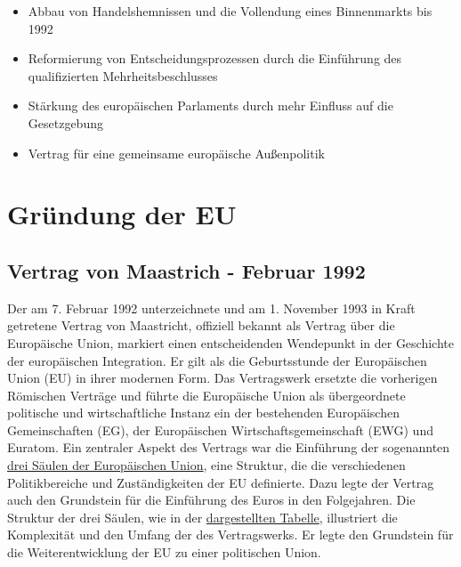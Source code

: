 \documentclass[12pt, oneside]{book} %
\begin{document}
\begin{itemize}
    \item Abbau von Handelshemnissen und die Vollendung eines Binnenmarkts bis 1992
    \item Reformierung von Entscheidungsprozessen durch die Einführung des qualifizierten Mehrheitsbeschlusses
    \item Stärkung des europäischen Parlaments durch mehr Einfluss auf die Gesetzgebung
    \item Vertrag für eine gemeinsame europäische Außenpolitik
\end{itemize}

\chapter{Gründung der EU}

\section{Vertrag von Maastrich - Februar 1992}
Der am 7. Februar 1992 unterzeichnete und am 1. November 1993 in Kraft getretene Vertrag von Maastricht, offiziell bekannt als Vertrag über die Europäische Union, markiert einen entscheidenden Wendepunkt in der Geschichte der europäischen Integration. Er gilt als die Geburtsstunde der Europäischen Union (EU) in ihrer modernen Form. Das Vertragswerk ersetzte die vorherigen Römischen Verträge und führte die Europäische Union als übergeordnete politische und wirtschaftliche Instanz ein der bestehenden Europäischen Gemeinschaften (EG), der Europäischen Wirtschaftsgemeinschaft (EWG) und Euratom. Ein zentraler Aspekt des Vertrags war die Einführung der sogenannten \hyperref[tab:eu_saeulen]{drei Säulen der Europäischen Union}, eine Struktur, die die verschiedenen Politikbereiche und Zuständigkeiten der EU definierte. Dazu legte der Vertrag auch den Grundstein für die Einführung des Euros in den Folgejahren.
Die Struktur der drei Säulen, wie in der \hyperref[tab:eu_saeulen]{dargestellten Tabelle}, illustriert die Komplexität und den Umfang der des Vertragswerks. Er legte den Grundstein für die Weiterentwicklung der EU zu einer politischen Union.
\end{document}

